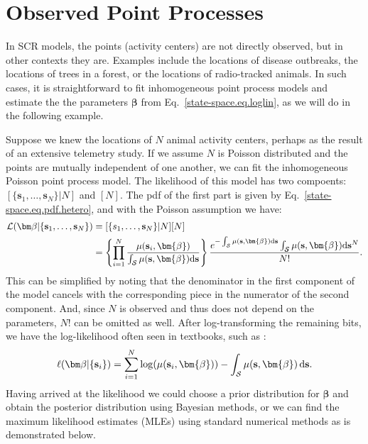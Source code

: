 \section{Observed Point Processes}

In SCR models, the points (activity centers) are not directly
observed, but in other contexts they are. Examples include the
locations of disease outbreaks, the locations of trees in a forest, or
the locations of radio-tracked animals. In such cases, it is
straightforward to fit inhomogeneous point process models and estimate the
the parameters $\bm \beta$ from Eq.~\ref{state-space.eq.loglin}, as we
will do in the following example. %

Suppose we knew the locations of $N$ animal activity
centers, perhaps as the result of an extensive telemetry study. %
If we assume $N$ is Poisson distributed and the points are
mutually independent of one another, we can fit the
inhomogeneous Poisson point process model. The likelihood of this
model has two compoents: $[\{\mathbf{s}_1, \ldots, \mathbf{s}_N\}|N]$
and $[N]$. The pdf of the first part is given by
Eq.~\ref{state-space.eq.pdf.hetero},
and with the Poisson assumption we have:
\begin{align*}
\mathcal{L}({\bm \beta} | \{{\bf s}_1, \ldots, \mathbf{s}_N\})
&= [\{s_1, \ldots, \mathbf{s}_N\}|N][N] \\
&= \left\{\prod_{i=1}^N
  \frac{\mu(\mathbf{s}_i,\bm{\beta})}{\int_{\mathcal{S}}\mu(\mathbf{s},\bm{\beta})\mathrm{d}\mathbf{s}} \right\}
  \frac{e^{-\int_{\mathcal{S}}\mu(\mathbf{s},\bm{\beta})\mathrm{d}\mathbf{s}}
    \int_{\mathcal{S}}\mu(\mathbf{s},\bm{\beta})\mathrm{d}\mathbf{s}^N}{N!}.
\end{align*}
This can be simplified by noting that the denominator in the first
component of the model cancels with the corresponding piece in the
numerator of the second component. And, since $N$ is observed and
thus does not depend on the parameters, $N!$ can be omitted as
well. After log-transforming the remaining bits, we have the
log-likelihood often seen in textbooks, such as \citet[pg. 104]{diggle:2003}:
\[
\ell({\bm \beta} | \{{\bf s}_i\}) = \sum_{i=1}^N
\log(\mu(\mathbf{s}_i, \bm{\beta})) - \int_{\mathcal{S}} \mu(\mathbf{s}, \bm{\beta}) \, \mathrm{d} \mathbf{s} .
\]
Having arrived at the likelihood we could choose a prior distribution for
$\bm \beta$ and obtain the posterior distribution %
using Bayesian methods, or we can find the maximum likelihood
estimates (MLEs) using standard numerical methods as is demonstrated
below.

